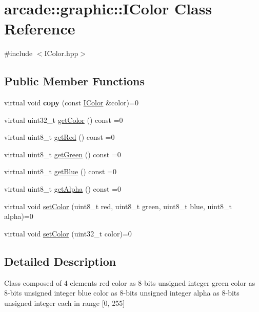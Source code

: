 \hypertarget{classarcade_1_1graphic_1_1_i_color}{}\section{arcade\+::graphic\+::I\+Color Class Reference}
\label{classarcade_1_1graphic_1_1_i_color}


{\ttfamily \#include $<$I\+Color.\+hpp$>$}

\subsection*{Public Member Functions}
\begin{DoxyCompactItemize}
\item 
\mbox{\label{classarcade_1_1graphic_1_1_i_color_a1f848c4abb31f95ca4ec9a2ee8b1f049}} 
virtual void {\bfseries copy} (const \mbox{\hyperlink{classarcade_1_1graphic_1_1_i_color}{I\+Color}} \&color)=0
\item 
virtual uint32\+\_\+t \mbox{\hyperlink{classarcade_1_1graphic_1_1_i_color_af0e1bcabdae131d45e416cc8de726d98}{get\+Color}} () const =0
\item 
virtual uint8\+\_\+t \mbox{\hyperlink{classarcade_1_1graphic_1_1_i_color_a054e1eaae2aba7396d8d53e72008be71}{get\+Red}} () const =0
\item 
virtual uint8\+\_\+t \mbox{\hyperlink{classarcade_1_1graphic_1_1_i_color_a415154c0e5a0cdd323de24a647cc09d5}{get\+Green}} () const =0
\item 
virtual uint8\+\_\+t \mbox{\hyperlink{classarcade_1_1graphic_1_1_i_color_a4d2755d998f9df75f9080f28e98b639b}{get\+Blue}} () const =0
\item 
virtual uint8\+\_\+t \mbox{\hyperlink{classarcade_1_1graphic_1_1_i_color_a44bd9427c1d58cbd49d64de03ffe86f2}{get\+Alpha}} () const =0
\item 
virtual void \mbox{\hyperlink{classarcade_1_1graphic_1_1_i_color_a3ce34b874767d2ab1eb435a43df08ac8}{set\+Color}} (uint8\+\_\+t red, uint8\+\_\+t green, uint8\+\_\+t blue, uint8\+\_\+t alpha)=0
\item 
virtual void \mbox{\hyperlink{classarcade_1_1graphic_1_1_i_color_ad5680051494a5f064dea8d6e6f6fb172}{set\+Color}} (uint32\+\_\+t color)=0
\end{DoxyCompactItemize}


\subsection{Detailed Description}
Class composed of 4 elements red color as 8-\/bits unsigned integer green color as 8-\/bits unsigned integer blue color as 8-\/bits unsigned integer alpha as 8-\/bits unsigned integer each in range \mbox{[}0, 255\mbox{]} 

